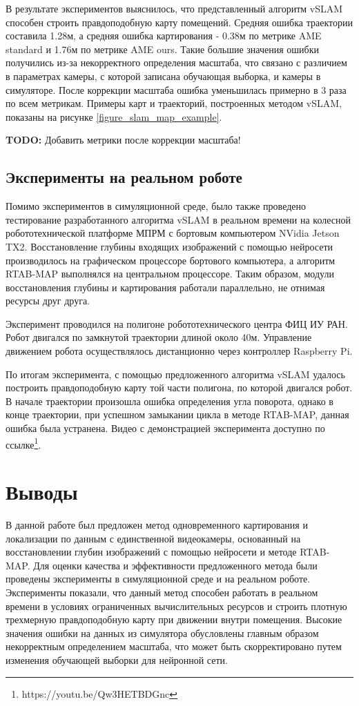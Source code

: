 \documentclass{mipt-thesis-ms}
\begin{document}
	В результате экспериментов выяснилось, что представленный алгоритм vSLAM способен строить правдоподобную карту помещений. Средняя ошибка траектории составила 1.28м, а средняя ошибка картирования - 0.38м по метрике AME standard и 1.76м по метрике AME ours. Такие большие значения ошибки получились из-за некорректного определения масштаба, что связано с различием в параметрах камеры, с которой записана обучающая выборка, и камеры в симуляторе. После коррекции масштаба ошибка уменьшилась примерно в 3 раза по всем метрикам. Примеры карт и траекторий, построенных методом vSLAM, показаны на рисунке \ref{figure_slam_map_example}.
	
	\textbf{TODO:} Добавить метрики после коррекции масштаба!
	
	\subsection{Эксперименты на реальном роботе}
	
	Помимо экспериментов в симуляционной среде, было также проведено тестирование разработанного алгоритма vSLAM в реальном времени на колесной робототехнической платформе МПРМ с бортовым компьютером NVidia Jetson TX2. Восстановление глубины входящих изображений с помощью нейросети производилось на графическом процессоре бортового компьютера, а алгоритм RTAB-MAP выполнялся на центральном процессоре. Таким образом, модули восстановления глубины и картирования работали параллельно, не отнимая ресурсы друг друга.
	
	Эксперимент проводился на полигоне робототехнического центра ФИЦ ИУ РАН. Робот двигался по замкнутой траектории длиной около 40м. Управление движением робота осуществлялось дистанционно через контроллер Raspberry Pi.
	
	По итогам эксперимента, с помощью предложенного алгоритма vSLAM удалось построить правдоподобную карту той части полигона, по которой двигался робот. В начале траектории произошла ошибка определения угла поворота, однако в конце траектории, при успешном замыкании цикла в методе RTAB-MAP, данная ошибка была устранена. Видео с демонстрацией эксперимента доступно по ссылке\footnote{https://youtu.be/Qw3HETBDGnc}.
	
	\section{Выводы}
	
	В данной работе был предложен метод одновременного картирования и локализации по данным с единственной видеокамеры, основанный на восстановлении глубин изображений с помощью нейросети и методе RTAB-MAP. Для оценки качества и эффективности предложенного метода были проведены эксперименты в симуляционной среде и на реальном роботе. Эксперименты показали, что данный метод способен работать в реальном времени в условиях ограниченных вычислительных ресурсов и строить плотную трехмерную правдоподобную карту при движении внутри помещения. Высокие значения ошибки на данных из симулятора обусловлены главным образом некорректным определением масштаба, что может быть скорректировано путем изменения обучающей выборки для нейронной сети.
	
\end{document}
